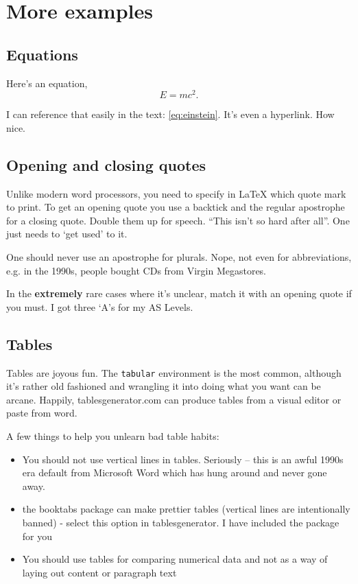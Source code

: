 
\chapter{More examples}

\section{Equations}

Here's an equation,
\begin{equation}
E=mc^2.\label{eq:einstein}
\end{equation}

\noindent I can reference that easily in the text: \autoref{eq:einstein}. It's even a hyperlink. How nice. 

\section{Opening and closing quotes}

Unlike modern word processors, you need to specify in \LaTeX{} which quote mark to print. To get an opening quote you use a backtick and the regular apostrophe for a closing quote. Double them up for speech. ``This isn't so hard after all''. One just needs to `get used' to it. 

One should never use an apostrophe for plurals. Nope, not even for abbreviations, e.g. in the 1990s, people bought CDs from Virgin Megastores. 

In the \textbf{extremely} rare cases where it's unclear, match it with an opening quote if you must. I got three `A's for my AS Levels. 

\section{Tables}

Tables are joyous fun. The \verb+tabular+ environment is the most common, although it's rather old fashioned and wrangling it into doing what you want can be arcane. Happily, tablesgenerator.com can produce tables from a visual editor or paste from word.

A few things to help you unlearn bad table habits:

\begin{itemize}
    \item You should not use vertical lines in tables. Seriously -- this is an awful 1990s era default from Microsoft Word which has hung around and never gone away. 
    \item the booktabs package can make prettier tables (vertical lines are intentionally banned) - select this option in tablesgenerator. I have included the package for you
    \item You should use tables for comparing numerical data and not as a way of laying out content or paragraph text
\end{itemize}

